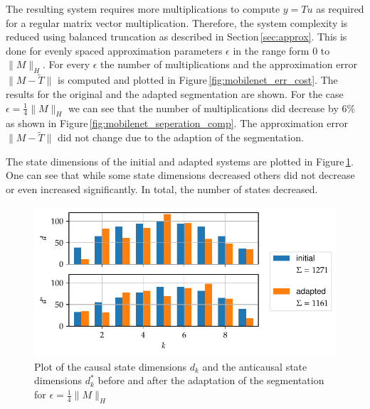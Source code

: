 \documentclass[numbers=noenddot,doctype=mastersthesis,BCOR=15mm,biblatex]{ldvbook}%
\begin{document}
The resulting system requires more multiplications to compute $y=Tu$ as required for a regular matrix vector multiplication.
Therefore, the system complexity is reduced using balanced truncation as described in Section\,\ref{sec:approx}.
This is done for evenly spaced approximation parameters $\epsilon$ in the range form 0 to $\|M\|_H$.
For every $\epsilon$ the number of multiplications and the approximation error $\| M-\tilde{T} \|$ is computed and plotted in Figure\,\ref{fig:mobilenet_err_cost}.
The results for the original and the adapted segmentation are shown.
For the case $\epsilon = \frac{1}{4} \|M\|_H$ we can see that the number of multiplications 
did decrease by $6\%$ as shown in Figure\,\ref{fig:mobilenet_seperation_comp}.
The approximation error $\| M-\tilde{T} \|$ did not change due to the adaption of the segmentation.

The state dimensions of the initial and adapted systems are plotted in Figure\,\ref{fig:mobilenet_state_dims_move}.
One can see that while some state dimensions decreased others did not decrease or even increased significantly.
In total, the number of states decreased.
\begin{figure}[!htb]
	\centering
	\includegraphics[width=\textwidth]{Plots/move_example_mobilenet_state_dims.pdf}
	\caption{Plot of the causal state dimensions $d_k$ and the anticausal state dimensions $d_k^*$ before and after the adaptation of the segmentation for $\epsilon = \frac{1}{4} \|M\|_H$
	}
	\label{fig:mobilenet_state_dims_move}
\end{figure}
\end{document}
